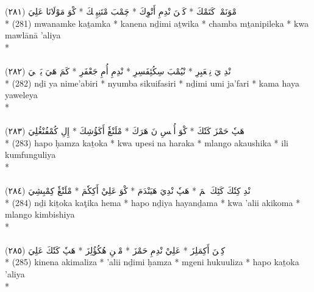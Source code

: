 \documentclass[a4paper, 12pt]{report}
\begin{document}
\begin{center}
\textarabic{(٢٨١) \textcolor{mygreen}{مْوَنَمْكٖ كَتَمْكَ  * كَنٖنَ نْدِمِ أَتْوِكَ  * چَمْبَ مْتَنِپِلٖكَ  * كْوَ مَوْلَانَا عَلِيَ }} \\* 
(281) mwanamke kaṯamka  * kanena nḏimi aṯwika  * chamba mṯanipileka  * kwa mawlānā 'aliya  \\* 
 \\ 
\\[8mm] 

\textarabic{(٢٨٢) \textcolor{mygreen}{نْدِ يَ نِمٖعَبِرِ  * نْيُمْبَ سِكُئِفَسِرِ  * نْدِمِ أُمِ جَعْفَرِ  * كَمَ هَيَ يَوٖلٖيَ }} \\* 
(282) nḏi ya nime'abiri  * nyumba sikuifasiri  * nḏimi umi ja'fari  * kama haya yaweleya  \\* 
 \\ 
\\[8mm] 

\textarabic{(٢٨٣) \textcolor{mygreen}{هَپٗ حَمْزَ كَتٗكَ  * كْوَ أُپٖسِ نَ هَرَكَ  * مْلَنْڠٗ أَكَؤُشِكَ  * إِلِ كُمْفُنْڠُلِيَ }} \\* 
(283) hapo ḥamza kaṯoka  * kwa upesi na haraka  * mlango akaushika  * ili kumfunguliya  \\* 
 \\ 
\\[8mm] 

\textarabic{(٢٨٤) \textcolor{mygreen}{نْدِ كِتٗكَ كَٹِكَ هٖمَ  * هَپٗ نْدِيَ هَيَنْدَمَ  * كْوَ عَلِيْ أَكِكٗمَ  * مْلَنْڠٗ كِمْبِشِيَ }} \\* 
(284) nḏi kiṯoka kaţika hema  * hapo nḏiya hayanḏama  * kwa 'alii akikoma  * mlango kimbishiya  \\* 
 \\ 
\\[8mm] 

\textarabic{(٢٨٥) \textcolor{mygreen}{كِنٖنَ أَكِمَلِزَ  * عَلِيْ نْدِمِ حَمْزَ  * مْڠٖنِ هُكُؤُلِزَ  * هَپٗ كَتٗكَ عَلِيَ }} \\* 
(285) kinena akimaliza  * 'alii nḏimi ḥamza  * mgeni hukuuliza  * hapo kaṯoka 'aliya  \\* 
 \\ 
\\[8mm] 


\end{center}
\end{document}
